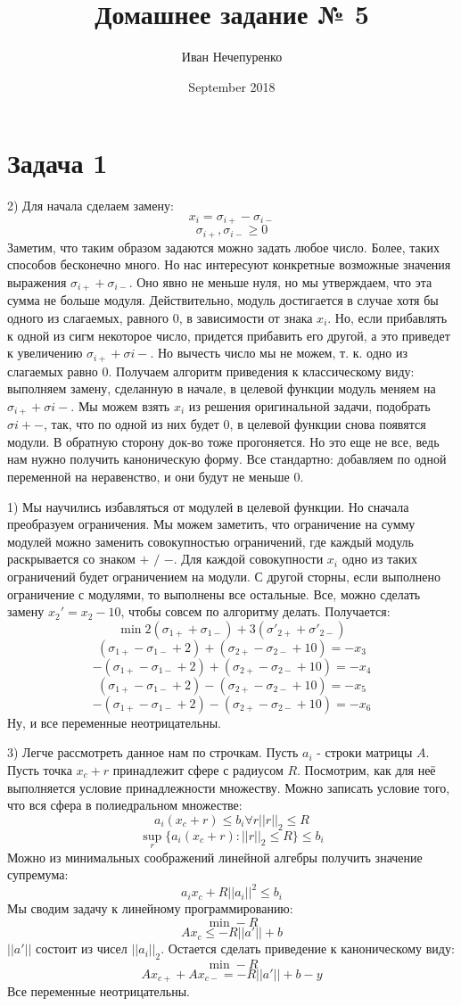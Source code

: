 \documentclass[tikz]{article}
\title{Домашнее задание № 5}
\author{Иван Нечепуренко }
\date{September 2018}
\begin{document}
\section{Задача 1}

2) Для начала сделаем замену:
$$ x_i = \sigma_{i+} - \sigma_{i-}$$
$$\sigma_{i+},  \sigma_{i-} \geq 0$$
Заметим, что таким образом задаются можно задать любое число. Более, таких способов бесконечно много. Но нас интересуют конкретные  возможные значения выражения $\sigma_{i+}+
\sigma_{i-}$. Оно явно не меньше нуля, но мы утверждаем, что эта сумма не больше модуля. Действительно, модуль достигается в случае хотя бы одного из слагаемых, равного $0$, в зависимости от знака $x_i$. Но, если прибавлять к одной из сигм некоторое число, придется прибавить его другой, а это приведет к увеличению $\sigma_{i+} + \sigma{i-}$. Но вычесть число мы не можем, т. к. одно из слагаемых равно 0. Получаем алгоритм приведения к классическому виду: выполняем замену, сделанную в начале, в целевой функции модуль меняем на 
$\sigma_{i+} + \sigma{i-}$. Мы можем взять $x_i$ из решения оригинальной задачи, подобрать 
$\sigma{i+-}$, так, что по одной из них будет $0$, в целевой функции снова появятся модули.
В обратную сторону док-во тоже прогоняется. Но это еще не все, ведь нам нужно получить каноническую форму. Все стандартно: добавляем по одной переменной на неравенство, и они будут не меньше 0.

1) Мы научились избавляться от модулей в целевой функции. Но сначала преобразуем ограничения.
Мы можем заметить, что ограничение на сумму модулей можно заменить совокупностью ограничений,
где каждый модуль раскрывается со знаком $+$ $/$ $-$. Для каждой совокупности $x_i$ одно 
из таких ограничений будет ограничением на модули. С другой сторны, если выполнено ограничение с модулями, то выполнены все остальные.  Все, можно сделать замену $x_2' = x_2 - 10$, чтобы совсем по алгоритму делать. Получается:
$$\min 2(\sigma_{1+} + \sigma_{1-}) + 3(\sigma'_{2+} + \sigma'_{2-})$$
$$ (\sigma_{1+} - \sigma_{1-} + 2) + (\sigma_{2+} - \sigma_{2-} + 10) = -x_3$$
$$ - (\sigma_{1+} - \sigma_{1-} + 2) + (\sigma_{2+} - \sigma_{2-} + 10) = -x_4$$
$$ (\sigma_{1+} - \sigma_{1-} + 2) - (\sigma_{2+} - \sigma_{2-} + 10) = -x_5$$
$$ - (\sigma_{1+} - \sigma_{1-} + 2) - (\sigma_{2+} - \sigma_{2-} + 10)  = -x_6$$
Ну, и все переменные неотрицательны.

3) Легче рассмотреть данное нам по строчкам. Пусть $a_i$ - строки матрицы $A$. Пусть
точка $x_c + r$ принадлежит сфере с радиусом $R$. Посмотрим, как для неё выполняется условие
принадлежности множеству. Можно записать условие того, что вся сфера в полиедральном множестве:
$$a_i (x_c + r) \leq b_i \forall r ||r||_2 \leq R$$
$$\sup\limits_r\{a_i (x_c + r): ||r||_2 \leq R\} \leq b_i$$
Можно из минимальных соображений линейной алгебры получить значение супремума:
$$a_i x_c + R||a_i||^2 \leq b_i$$
Мы сводим задачу к линейному программированию:
$$ \min -R$$
$$ Ax_c \leq -R||a'|| + b$$
$||a'||$ состоит из чисел $||a_i||_2$. Остается сделать приведение к каноническому виду:
$$ \min -R$$
$$ Ax_{c+} + Ax_{c-}= -R||a'|| + b - y$$
Все переменные неотрицательны.
\end{document}
